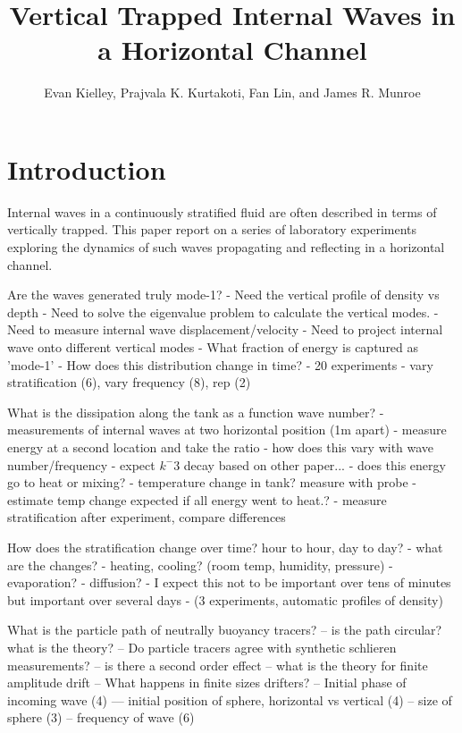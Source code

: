 \documentclass[11pt,letterpaper]{article}
\title{Vertical Trapped Internal Waves in a Horizontal Channel}
\author{Evan Kielley, Prajvala K. Kurtakoti, Fan Lin, and James R. Munroe}
\begin{document}
	\maketitle
	
	\section{Introduction}
	
	Internal waves in a continuously stratified fluid are often described in terms of vertically trapped.  This paper report on a series of laboratory experiments exploring the dynamics of such waves propagating and reflecting in a horizontal channel.
	
	 Are the waves generated truly mode-1?  
		- Need the vertical profile of density vs depth 
		- Need to solve the eigenvalue problem to calculate the vertical modes.
		- Need to measure internal wave displacement/velocity
		- Need to project internal wave onto different vertical modes
		- What fraction of energy is captured as 'mode-1'
		- How does this distribution change in time?
		- 20 experiments
		- vary stratification (6), vary frequency (8), rep (2)

	What is the dissipation along the tank as a function wave number?	
	   - measurements of internal waves at two horizontal position (1m apart)
	   - measure energy at a second location and take the ratio
	       - how does this vary with wave number/frequency
	       - expect $k^-3$ decay based on other paper... 
	   - does this energy go to heat or mixing?
	       - temperature change in tank? measure with probe
	            - estimate temp change expected if all energy went to heat.?
	       - measure stratification after experiment, compare differences
	   
	  How does the stratification change over time? hour to hour, day to day?
	   	 - what are the changes?
	   	 - heating, cooling? (room temp, humidity, pressure)
	   	 - evaporation?
	   	 - diffusion?
	   	 - I expect this not to be important over tens of minutes but important over several days
	   	 - (3 experiments, automatic profiles of density)
	   	 
	 What is the particle path of neutrally buoyancy tracers? 
	    -- is the path circular? what is the theory?
	    -- Do particle tracers agree with synthetic schlieren measurements?
	    -- is there a second order effect
		   -- what is the theory for finite amplitude drift
		   -- What happens in finite sizes drifters? 
		       -- Initial phase of incoming wave    (4)
		       --- initial position of sphere, horizontal vs vertical (4)
		       --  size of sphere (3)
		        --  frequency of wave (6)
	   	   	
\end{document}
